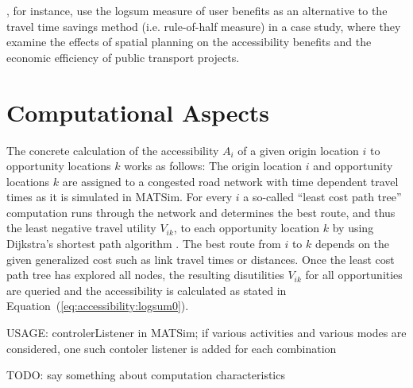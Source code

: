 \citet{GeuersEtAl20xx}, for instance, use the logsum measure of user benefits as an alternative to the travel time 
savings method (i.e. rule-of-half measure) in a case study, where they examine the effects of spatial planning on 
the accessibility benefits and the economic efficiency of public transport projects.




\section{Computational Aspects}

The concrete calculation of the accessibility $A_i$ of a given origin location $i$ to opportunity locations $k$ works as 
follows: The origin location $i$ and opportunity locations $k$ are assigned to a congested road network with time dependent 
travel times as it is simulated in MATSim. For every $i$ a so-called ``least cost path tree'' computation runs through the 
network and determines the best route, and thus the least negative travel utility $V_{ik}$, to each opportunity location 
$k$ by using Dijkstra's shortest path algorithm \citep{Dijkstra1959ShortestPath}. The best route from $i$ to $k$ depends 
on the given generalized cost such as link travel times or distances. Once the least cost path tree has explored all 
nodes, the resulting disutilities $V_{ik}$ for all opportunities are queried and the accessibility is calculated as 
stated in Equation~(\ref{eq:accessibility:logsum0}).


USAGE: controlerListener in MATSim; if various activities and various modes are considered, one such contoler listener 
is added for each combination


TODO: say something about computation characteristics

